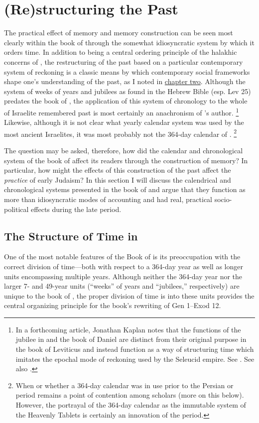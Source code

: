 \section{(Re)structuring the Past}
The practical effect of memory and memory construction can be seen most clearly within the book of \jub through the somewhat idiosyncratic system by which it orders time. In addition to being a central ordering principle of the halakhic concerns of \jub, the restructuring of the past based on a particular contemporary system of reckoning is a classic means by which contemporary social frameworks shape one's understanding of the past, as I noted in \hyperref[chap:memory]{chapter two}. Although the system of weeks of years and jubilees as found in the Hebrew Bible (esp. Lev 25) predates the book of \jub, the application of this system of chronology to the whole of Israelite remembered past is most certainly an anachronism of \jub's author.%
    \footnote{%
        In a forthcoming article, Jonathan Kaplan notes that the functions of the jubilee in \jub and the book of Daniel are distinct from their original purpose in the book of Leviticus and instead function as a way of structuring time which imitates the epochal mode of reckoning used by the Seleucid empire. See 
        \cite{kaplan_jaj2019}. See also 
        \cite[137--186]{kosmin2018}.}
Likewise, although it is not clear what yearly calendar system was used by the most ancient Israelites, it was most probably not the 364-day calendar of \jub.%
    \footnote{%
        When or whether a 364-day calendar was in use prior to the Persian or \secondtemple period remains a point of contention among scholars (more on this below). However, the portrayal of the 364-day calendar as the immutable system of the Heavenly Tablets is certainly an innovation of the \secondtemple period.}

The question may be asked, therefore, how did the calendar and chronological system of the book of \jub affect its readers through the construction of memory? In particular, how might the effects of this construction of the past affect the \emph{practice} of early Judaism? In this section I will discuss the calendrical and chronological systems presented in the book of \jub and argue that they function as more than idiosyncratic modes of accounting and had real, practical socio-political effects during the late \secondtemple period.

\subsection{The Structure of Time in \jub}
One of the most notable features of the Book of \jub is its preoccupation with the correct division of time---both with respect to a 364-day year as well as longer units encompassing multiple years. Although neither the 364-day year nor the larger 7- and 49-year units (``weeks'' of years and ``jubilees,'' respectively) are unique to the book of \jub, the proper division of time is into these units provides the central organizing principle for the book's rewriting of Gen 1--Exod 12.

